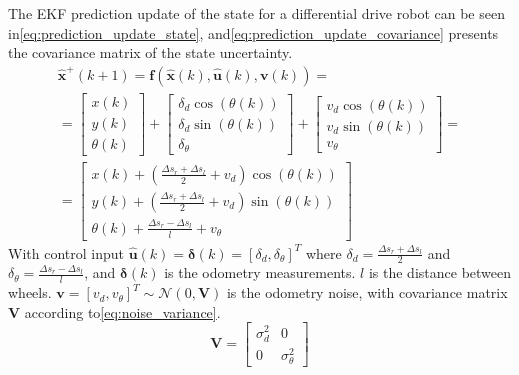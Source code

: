 The EKF prediction update of the state for a differential drive robot can be seen in\:\eqref{eq:prediction_update_state}, and\:\eqref{eq:prediction_update_covariance} presents the covariance matrix of the state uncertainty\:\cite{corke_robotics_2023}.
\begin{equation}
    \begin{split}
        \label{eq:prediction_update_state}
        \hat{\mathbf{x}}^+(k+1) = \mathbf{f}(\hat{\mathbf{x}} (k), \hat{\mathbf{u}} (k),\mathbf{v} (k)) = \\
        =
        \begin{bmatrix}
            x(k) \\
            y(k) \\
            \theta (k)
        \end{bmatrix}
        +
        \begin{bmatrix}
            \delta_d \cos{(\theta (k))} \\
            \delta_d \sin{(\theta (k))} \\
            \delta_{\theta}
        \end{bmatrix}
        +
        \begin{bmatrix}
            v_d \cos{(\theta (k))} \\
            v_d \sin{(\theta (k))} \\
            v_{\theta}
        \end{bmatrix}
        = \\
        =
        \begin{bmatrix}
            x(k) + (\frac{\Delta s_r + \Delta s_l}{2} + v_d) \cos{(\theta (k))} \\
            y(k) + (\frac{\Delta s_r + \Delta s_l}{2} + v_d) \sin{(\theta (k))} \\
            \theta (k) + \frac{\Delta s_r - \Delta s_l}{l} + v_{\theta}
        \end{bmatrix}
    \end{split}
\end{equation}
With control input $\hat{\mathbf{u}} (k) = \mathbf{\delta} (k) = [\delta_d, \delta_{\theta}]^T$ where $\delta_d = \frac{\Delta s_r + \Delta s_l}{2}$ and $\delta_{\theta} = \frac{\Delta s_r - \Delta s_l}{l}$, and $\mathbf{\delta} (k)$ is the odometry measurements\:\cite{corke_robotics_2023}. $l$ is the distance between wheels.
$\mathbf{v} = [v_d,v_{\theta}]^T \sim \mathcal{N}(0, \mathbf{V})$ is the odometry noise, with covariance matrix $\mathbf{V}$ according to\:\eqref{eq:noise_variance}\:\cite{corke_robotics_2023}.
\begin{equation}
    \label{eq:noise_variance}
    \mathbf{V} =
    \begin{bmatrix}
        \sigma_d^2 & 0 \\
        0 & \sigma_{\theta}^2
    \end{bmatrix}
\end{equation}


